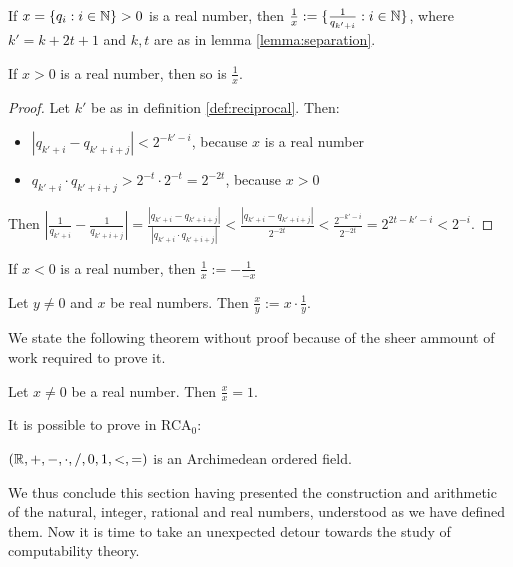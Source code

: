 \documentclass[../main.tex]{memoir}
\begin{document}
\begin{definition}
  \label{def:reciprocal}
  If $x = \{q_i: i \in \mathbb{N}\} > 0$ is a real number, then $\frac{1}{x} := \{\frac{1}{q_{k' + i}}: i \in \mathbb{N}\}$, where $k' = k + 2t + 1$ and $k, t$ are as in lemma \ref{lemma:separation}.
\end{definition}

\begin{theorem}
  If $x > 0$ is a real number, then so is $\frac{1}{x}$.
\end{theorem}
\begin{proof}
  Let $k'$ be as in definition \ref{def:reciprocal}. Then:

  \begin{itemize}
  \item $|q_{k' + i} - q_{k' + i + j}| < 2^{-k' - i}$, because $x$ is a real number
  \item $q_{k' + i} \cdot q_{k' + i + j} > 2^{-t} \cdot 2^{-t} = 2^{-2t}$, because $x > 0$
  \end{itemize}

  Then $\left| \frac{1}{q_{k' + i}} - \frac{1}{q_{k' + i + j}} \right| = \frac{|q_{k' + i} - q_{k' + i + j}|}{|q_{k' + i} \cdot q_{k' + i + j}|} < \frac{|q_{k' + i} - q_{k' + i + j}|}{ 2^{-2t} } < \frac{ 2^{-k' - i} }{ 2^{-2t} } = 2^{2t - k' - i} < 2^{-i}$.
\end{proof}

\begin{definition}
  If $x < 0$ is a real number, then $\frac{1}{x} := - \frac{1}{-x}$
\end{definition}

\begin{definition}
  Let $y \neq 0$ and $x$ be real numbers. Then $\frac{x}{y} := x \cdot \frac{1}{y}$.
\end{definition}

We state the following theorem without proof because of the sheer ammount of work required to prove it.

\begin{theorem}
  Let $x \neq 0$ be a real number. Then $\frac{x}{x} = 1$.
\end{theorem}

It is possible to prove in RCA$_0$:

\begin{theorem}
  $(\mathbb{R}, +, -, \cdot, /, 0, 1, <, =)$ is an Archimedean ordered field.
\end{theorem}

We thus conclude this section having presented the construction and arithmetic of the natural, integer, rational and real numbers, understood as we have defined them. Now it is time to take an unexpected detour towards the study of computability theory.
\end{document}
